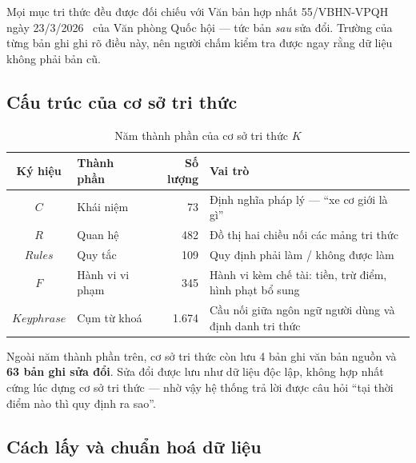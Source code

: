 Mọi mục tri thức đều được đối chiếu với Văn bản hợp nhất 55/VBHN-VPQH ngày
23/3/2026~\cite{vbhn55} của Văn phòng Quốc hội --- tức bản \emph{sau} sửa đổi. Trường
 của từng bản ghi ghi rõ điều này, nên người chấm kiểm tra được ngay rằng
dữ liệu không phải bản cũ.

\subsection{Cấu trúc của cơ sở tri thức}

\begin{table}[H]
\centering
\caption{Năm thành phần của cơ sở tri thức $K$}
\label{tab:thanh-phan-K}
\renewcommand{\arraystretch}{1.2}
\begin{tabularx}{\textwidth}{@{}c l r L@{}}
\toprule
\textbf{Ký hiệu} & \textbf{Thành phần} & \textbf{Số lượng} & \textbf{Vai trò} \\
\midrule
$C$                 & Khái niệm        & 73    & Định nghĩa pháp lý --- ``xe cơ giới là gì'' \\
$R$                 & Quan hệ          & 482   & Đồ thị hai chiều nối các mảng tri thức \\
$\mathit{Rules}$    & Quy tắc          & 109   & Quy định phải làm / không được làm \\
$F$                 & Hành vi vi phạm  & 345   & Hành vi kèm chế tài: tiền, trừ điểm, hình phạt bổ sung \\
$\mathit{Keyphrase}$& Cụm từ khoá      & 1.674 & Cầu nối giữa ngôn ngữ người dùng và định danh tri thức \\
\bottomrule
\end{tabularx}
\end{table}

Ngoài năm thành phần trên, cơ sở tri thức còn lưu 4 bản ghi văn bản nguồn và \textbf{63 bản
ghi sửa đổi}. Sửa đổi được lưu như dữ liệu độc lập, không hợp nhất cứng lúc dựng cơ sở tri
thức --- nhờ vậy hệ thống trả lời được câu hỏi ``tại thời điểm nào thì quy định ra sao''.

\subsection{Cách lấy và chuẩn hoá dữ liệu}

